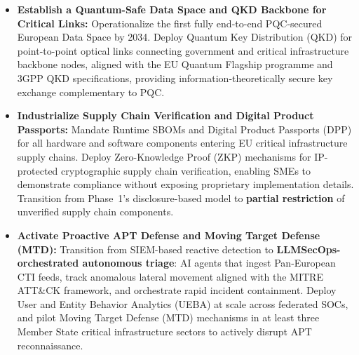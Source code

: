 \documentclass{ieeeaccess}
\begin{document}
\begin{itemize}
    \item \textbf{Establish a Quantum-Safe Data Space and QKD Backbone for Critical Links:}
    Operationalize the first fully end-to-end PQC-secured European Data Space by 2034.
    Deploy Quantum Key Distribution (QKD) for point-to-point optical links connecting
    government and critical infrastructure backbone nodes, aligned with the EU Quantum
    Flagship programme and 3GPP QKD specifications, providing information-theoretically
    secure key exchange complementary to PQC.

    \item \textbf{Industrialize Supply Chain Verification and Digital Product Passports:}
    Mandate Runtime SBOMs and Digital Product Passports (DPP) for all hardware and software
    components entering EU critical infrastructure supply chains. Deploy Zero-Knowledge
    Proof (ZKP) mechanisms for IP-protected cryptographic supply chain verification,
    enabling SMEs to demonstrate compliance without exposing proprietary implementation
    details. Transition from Phase~1's disclosure-based model to \textbf{partial restriction}
    of unverified supply chain components.

    \item \textbf{Activate Proactive APT Defense and Moving Target Defense (MTD):}
    Transition from SIEM-based reactive detection to \textbf{LLMSecOps-orchestrated
    autonomous triage}: AI agents that ingest Pan-European CTI feeds, track anomalous
    lateral movement aligned with the MITRE ATT\&CK framework, and orchestrate rapid
    incident containment. Deploy User and Entity Behavior Analytics (UEBA) at scale across
    federated SOCs, and pilot Moving Target Defense (MTD) mechanisms in at least three
    Member State critical infrastructure sectors to actively disrupt APT reconnaissance.
\end{itemize}
\end{document}
